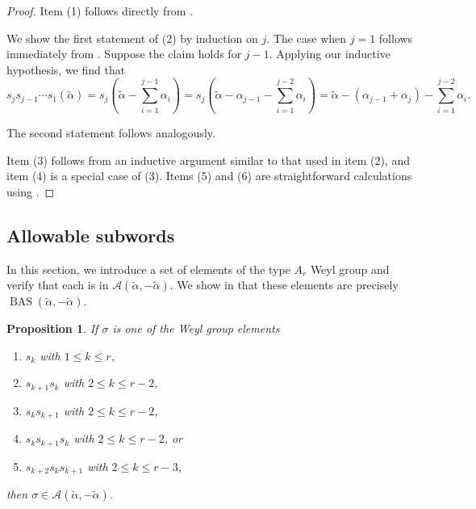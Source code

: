 \documentclass{amsart}
\newtheorem{proposition}[theorem]{Proposition}
\theoremstyle{definition}
\DeclareMathOperator{\BAS}{BAS}
\newcommand{\hroot}{\tilde{\alpha}}
\newcommand{\calA}{\mathcal{A}}
\begin{document}
\begin{proof}
Item (1) follows directly from . 

We show the first statement of (2) by induction on $j$. 
The case when $j = 1$ follows immediately from . 
Suppose the claim holds for $j-1$. Applying our inductive hypothesis, we find that  
\[s_j s_{j-1} \cdots s_1\left(\tilde{\alpha}\right) = s_j\left(\tilde{\alpha} - \sum_{i=1}^{j-1} \alpha_i\right) =s_j\left(\hroot - \alpha_{j-1}-\sum_{i=1}^{j-2}\alpha_i\right) = \tilde{\alpha} - \left(\alpha_{j-1} + \alpha_j\right) - \sum_{i=1}^{j-2} \alpha_i.
\]


The second statement follows analogously. 

Item (3) follows from an inductive argument similar to that used in item (2), and item (4) is a special case of (3). 
Items (5) and (6) are straightforward calculations using . 
\end{proof}

\subsection{Allowable subwords}\label{sec:allowable_subwords}

In this section, we introduce a set of elements of the type $A_r$ Weyl group and verify that each is in $\calA(\tilde\alpha,-\tilde\alpha)$. We show in  that these elements are precisely $\BAS(\tilde\alpha,-\tilde\alpha)$.

\begin{proposition}\label{prop:mu=-hroot}
If $\sigma$ is one of the Weyl group elements
\begin{enumerate}
\item[(a)] $s_k$ with $1 \le k \le r$,
\item[(b)] $s_{k+1}s_{k}$ with $2 \le k \le r-2$,
\item[(c)] $s_{k}s_{k+1}$ with $2 \le k \le r-2$, 
\item[(d)] $s_{k}s_{k+1}s_{k}$ with $2 \le k \le r-2$, or
\item[(e)] $s_{k+2}s_{k}s_{k+1}$ with $2 \le k \le r-3$, 
\end{enumerate}
then $\sigma \in \calA(\tilde{\alpha},-\tilde{\alpha})$. 
\end{proposition} 
\end{document}
